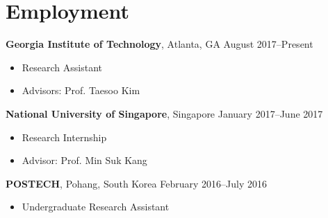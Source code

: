 \section*{Employment}

\begin{description}
\item {\bf Georgia Institute of Technology}, Atlanta, GA \dotfill August 2017--Present
  \begin{itemize}
  \item Research Assistant
  \item Advisors: Prof. Taesoo Kim
  \end{itemize}
  
\item {\bf National University of Singapore}, Singapore \dotfill January 2017--June 2017
  \begin{itemize}
  \item Research Internship
  \item Advisor: Prof. Min Suk Kang
  \end{itemize}

\item {\bf POSTECH}, Pohang, South Korea \dotfill February 2016--July 2016
  \begin{itemize}
  \item Undergraduate Research Assistant
  \end{itemize}
\end{description}
